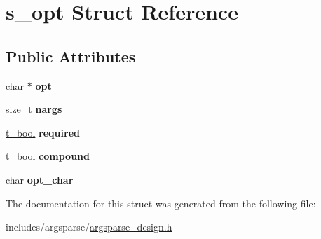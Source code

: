 \hypertarget{structs__opt}{}\section{s\+\_\+opt Struct Reference}
\label{structs__opt}
\subsection*{Public Attributes}
\begin{DoxyCompactItemize}
\item 
char $\ast$ {\bfseries opt}\hypertarget{structs__opt_a14f793c5c9b9d595ae0604c7298dc612}{}\label{structs__opt_a14f793c5c9b9d595ae0604c7298dc612}

\item 
size\+\_\+t {\bfseries nargs}\hypertarget{structs__opt_a593df7e8d1e0c02970d9ae8c07fe0cee}{}\label{structs__opt_a593df7e8d1e0c02970d9ae8c07fe0cee}

\item 
\hyperlink{bool_8h_ab719d996d8c101c34248bc256b8dcfd8}{t\+\_\+bool} {\bfseries required}\hypertarget{structs__opt_a9f0f73f14df325bf895fe3981b5dee02}{}\label{structs__opt_a9f0f73f14df325bf895fe3981b5dee02}

\item 
\hyperlink{bool_8h_ab719d996d8c101c34248bc256b8dcfd8}{t\+\_\+bool} {\bfseries compound}\hypertarget{structs__opt_ac4889995cad6171e03ff105b2494c409}{}\label{structs__opt_ac4889995cad6171e03ff105b2494c409}

\item 
char {\bfseries opt\+\_\+char}\hypertarget{structs__opt_ad2c2e3d7267c7af9ee91bf825b59d8aa}{}\label{structs__opt_ad2c2e3d7267c7af9ee91bf825b59d8aa}

\end{DoxyCompactItemize}


The documentation for this struct was generated from the following file\+:\begin{DoxyCompactItemize}
\item 
includes/argsparse/\hyperlink{argsparse__design_8h}{argsparse\+\_\+design.\+h}\end{DoxyCompactItemize}
